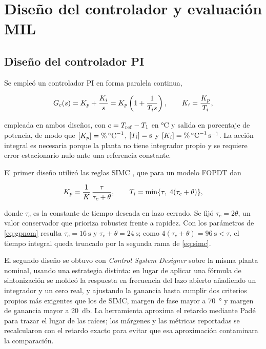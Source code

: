 \section{Diseño del controlador y evaluación MIL}

\subsection{Diseño del controlador PI}

Se empleó un controlador PI en forma paralela continua,

\begin{equation}
G_c(s) = K_p + \frac{K_i}{s} = K_p\left(1 + \frac{1}{T_i s}\right),
\qquad K_i = \frac{K_p}{T_i},
\label{eq:pi}
\end{equation}

empleada en ambos diseños, con $e = T_{\mathrm{ref}} - T_1$ en \si{\celsius} y salida en porcentaje de
potencia, de modo que
$[K_p] = \si{\percent\per\celsius}$, $[T_i] = \si{\second}$ y
$[K_i] = \si{\percent\per\celsius\per\second}$. La acción integral es necesaria porque la planta no
tiene integrador propio y se requiere error estacionario nulo ante una referencia constante.

El primer diseño utilizó las reglas SIMC \cite{skogestad2003}, que para un modelo FOPDT dan

\begin{equation}
K_p = \frac{1}{K}\,\frac{\tau}{\tau_c + \theta},
\qquad
T_i = \min\{\tau,\; 4(\tau_c + \theta)\},
\label{eq:simc}
\end{equation}

donde $\tau_c$ es la constante de tiempo deseada en lazo cerrado. Se fijó $\tau_c = 2\theta$, un
valor conservador que prioriza robustez frente a rapidez. Con los parámetros de \eqref{eq:gpnom}
resulta $\tau_c = \SI{16}{\second}$ y $\tau_c + \theta = \SI{24}{\second}$; como
$4(\tau_c+\theta) = \SI{96}{\second} < \tau$, el tiempo integral queda truncado por la segunda rama
de \eqref{eq:simc}.

El segundo diseño se obtuvo con \emph{Control System Designer} sobre la misma planta nominal,
usando una estrategia distinta: en lugar de aplicar una fórmula de sintonización se moldeó la
respuesta en frecuencia del lazo abierto añadiendo un integrador y un cero real, y ajustando la
ganancia hasta cumplir dos criterios propios más exigentes que los de SIMC, margen de fase mayor a
\SI{70}{\degree} y margen de ganancia mayor a \SI{20}{\decibel}. La herramienta aproxima el retardo
mediante Padé para trazar el lugar de las raíces; los márgenes y las métricas reportadas se
recalcularon con el retardo exacto para evitar que esa aproximación contaminara la comparación.


